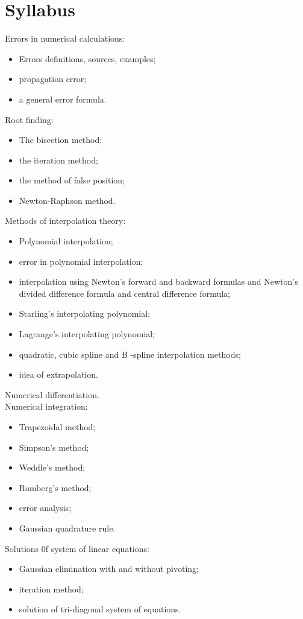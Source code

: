 \documentclass[12pt,class=book,crop=false]{standalone}
\begin{document}
\chapter*{Syllabus}
Errors in numerical calculations:
\begin{itemize}[noitemsep]
    \item Errors definitions, sources, examples;
    \item propagation error;
    \item a general error formula.
\end{itemize}
Root finding:
\begin{itemize}[noitemsep]
    \item The bisection method;
    \item the iteration method;
    \item the method of false position;
    \item Newton-Raphson method.
\end{itemize}
Methods of interpolation theory:
\begin{itemize}[noitemsep]
    \item Polynomial interpolation;
    \item error in polynomial interpolation;
    \item interpolation using Newton's forward and backward formulas and Newton's divided difference formula and central difference formula;
    \item Starling's interpolating polynomial;
    \item Lagrange's interpolating polynomial;
    \item quadratic, cubic spline and B -spline interpolation methods;
    \item idea of extrapolation.
\end{itemize}
Numerical differentiation.\\
Numerical integration:
\begin{itemize}[noitemsep]
    \item Trapezoidal method;
    \item Simpson's method;
    \item Weddle's method;
    \item Romberg's method;
    \item error analysis;
    \item Gaussian quadrature rule.
\end{itemize} 
Solutions 0f system of linear equations:
\begin{itemize}[noitemsep]
    \item Gaussian elimination with and without pivoting;
    \item iteration method;
    \item solution of tri-diagonal system of equations.
\end{itemize}
\end{document}
